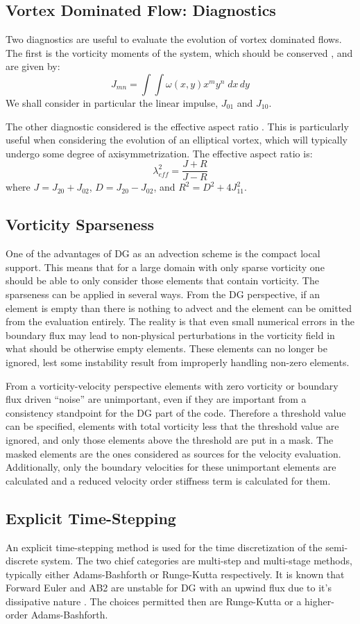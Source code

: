 \documentclass[]{aiaa-tc}%
\newcommand{\be}{\begin{equation}}
\newcommand{\ee}{\end{equation}}
\begin{document}
\subsection{Vortex Dominated Flow: Diagnostics}
Two diagnostics are useful to evaluate the evolution of vortex dominated flows. The first is the vorticity moments of the system, which should be conserved \cite{Koum1997}, and are given by:
\be J_{mn}=\int\int \omega(x,y)x^my^n \; dx\,dy \ee
We shall consider in particular the linear impulse, $J_{01}$ and $J_{10}$.

The other diagnostic considered is the effective aspect ratio \cite{Koum1997}. This is particularly useful when considering the evolution of an elliptical vortex, which will typically undergo some degree of axisymmetrization. The effective aspect ratio is:
\be \lambda_{eff}^2 = \frac{J+R}{J-R} \ee
where $J=J_{20}+J_{02}$, $D=J_{20}-J_{02}$, and $R^2=D^2+4J_{11}^2$.

\subsection{Vorticity Sparseness}
One of the advantages of DG as an advection scheme is the compact local support. This means that for a large domain with only sparse vorticity one should be able to only consider those elements that contain vorticity. The sparseness can be applied in several ways. From the DG perspective, if an element is empty than there is nothing to advect and the element can be omitted from the evaluation entirely. The reality is that even small numerical errors in the boundary flux may lead to non-physical perturbations in the vorticity field in what should be otherwise empty elements. These elements can no longer be ignored, lest some instability result from improperly handling non-zero elements.

From a vorticity-velocity perspective elements with zero vorticity or boundary flux driven ``noise'' are unimportant, even if they are important from a consistency standpoint for the DG part of the code. Therefore a threshold value can be specified, elements with total vorticity less that the threshold value are ignored, and only those elements above the threshold are put in a mask. The masked elements are the ones considered as sources for the velocity evaluation. Additionally, only the boundary velocities for these unimportant elements are calculated and a reduced velocity order stiffness term is calculated for them.

\subsection{Explicit Time-Stepping}\label{TimeStep}
An explicit time-stepping method is used for the time discretization of the semi-discrete system. The two chief categories are multi-step and multi-stage methods, typically either Adams-Bashforth or Runge-Kutta respectively. It is known that Forward Euler and AB2 are unstable for DG with an upwind flux due to it's dissipative nature \cite{Reid}. The choices permitted then are Runge-Kutta or a higher-order Adams-Bashforth.
\end{document}
